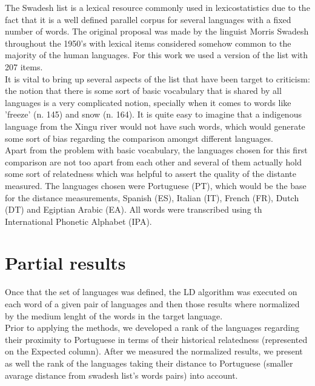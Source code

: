 \documentclass[runningheads]{llncs}
\begin{document}
The Swadesh list is a lexical resource commonly used in lexicostatistics due to the fact that it is a well defined parallel corpus for several languages with a fixed number of words. The original proposal was made by the linguist Morris Swadesh throughout the 1950's \cite{swadesh1955towards} with lexical items considered somehow common to the majority of the human languages. For this work we used a version of the list with 207 items.\\

It is vital to bring up several aspects of the list that have been target to criticism: the notion that there is some sort of basic vocabulary that is shared by all languages is a very complicated notion, specially when it comes to words like 'freeze' (n. 145) and snow (n. 164). It is quite easy to imagine that a indigenous language from the Xingu river would not have such words, which would generate some sort of bias regarding the comparison amongst different languages.\\

Apart from the problem with basic vocabulary, the languages chosen for this first comparison are not too apart from each other and several of them actually hold some sort of relatedness which was helpful to assert the quality of the distante measured. The languages chosen were Portuguese (PT), which would be the base for the distance measurements, Spanish (ES), Italian (IT), French (FR), Dutch (DT) and Egiptian Arabic (EA). All words were transcribed using th International Phonetic Alphabet (IPA).\\

\section{Partial results}

Once that the set of languages was defined, the LD algorithm was executed on each word of a given pair of languages and then those results where normalized by the medium lenght of the words in the target language.\\

Prior to applying the methods, we developed a rank of the languages regarding their proximity to Portuguese in terms of their historical relatedness (represented on the Expected column). After we measured the normalized results, we present as well the rank of the languages taking their distance to Portuguese (smaller avarage distance from swadesh list's words pairs) into account.\\
\end{document}
